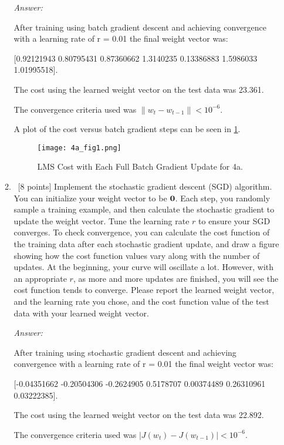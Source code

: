 \documentclass[12pt, fullpage,letterpaper]{article}
\begin{document}
\begin{enumerate}
\begin{enumerate}
		\textit{Answer:}

		After training using batch gradient descent and achieving convergence with a learning rate of r = 0.01 the final weight vector was: 
		
		[0.92121943 0.80795431 0.87360662 1.3140235  0.13386883 1.5986033 1.01995518].
		
		The cost using the learned weight vector on the test data was 23.361.

		The convergence criteria used was $\|w_{t} - w_{t-1}\| < 10^{-6}$.

		A plot of the cost versus batch gradient steps can be seen in \ref{fig:4a1}.

		\begin{figure}[h]
		\begin{center}
		\texttt{[image: 4a\_fig1.png]}
		\end{center}
		\caption{LMS Cost with Each Full Batch Gradient Update for 4a.}
		\label{fig:4a1}
		\end{figure}


		\item~[8 points] Implement the stochastic gradient descent (SGD) algorithm. You can initialize your weight vector to be ${\bf 0}$. Each step, you randomly sample a training example, and then calculate the stochastic gradient to update the weight vector.  Tune the learning rate $r$ to ensure your SGD converges. To check convergence, you can calculate the cost function of the training data after each stochastic gradient update, and draw a figure showing how the cost function values vary along with the number of updates. At the beginning, your curve will oscillate a lot. However, with an appropriate $r$, as more and more updates are finished, you will see the cost function tends to converge. Please report the learned weight vector, and the learning rate you chose, and the cost function value of the test data with your learned weight vector.   

		\textit{Answer:}

		After training using stochastic gradient descent and achieving convergence with a learning rate of r = 0.01 the final weight vector was:
		
		[-0.04351662 -0.20504306 -0.2624905 0.5178707 0.00374489 0.26310961 0.03222385].

		The cost using the learned weight vector on the test data was 22.892.

		The convergence criteria used was $|J(w_{t}) - J(w_{t-1})| < 10^{-6}$.


\end{enumerate}
\end{enumerate}
\end{document}

